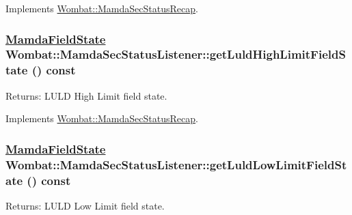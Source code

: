 Implements \hyperlink{classWombat_1_1MamdaSecStatusRecap_db80d6bb0167935b3b622d6dde3a42bd}{Wombat::Mamda\-Sec\-Status\-Recap}.\hypertarget{classWombat_1_1MamdaSecStatusListener_d56a6b2b5df893dd0ffc515ade629a43}{
\subsubsection[getLuldHighLimitFieldState]{\setlength{\rightskip}{0pt plus 5cm}\hyperlink{namespaceWombat_93aac974f2ab713554fd12a1fa3b7d2a}{Mamda\-Field\-State} Wombat::Mamda\-Sec\-Status\-Listener::get\-Luld\-High\-Limit\-Field\-State () const}}
\label{classWombat_1_1MamdaSecStatusListener_d56a6b2b5df893dd0ffc515ade629a43}


\begin{Desc}
\item[Returns:]LULD High Limit field state. \end{Desc}


Implements \hyperlink{classWombat_1_1MamdaSecStatusRecap_1c7c1b9dd0362117ad1e877fa24a3227}{Wombat::Mamda\-Sec\-Status\-Recap}.\hypertarget{classWombat_1_1MamdaSecStatusListener_ec9193e6cfd9d44150815af67ea2fbac}{
\subsubsection[getLuldLowLimitFieldState]{\setlength{\rightskip}{0pt plus 5cm}\hyperlink{namespaceWombat_93aac974f2ab713554fd12a1fa3b7d2a}{Mamda\-Field\-State} Wombat::Mamda\-Sec\-Status\-Listener::get\-Luld\-Low\-Limit\-Field\-State () const}}
\label{classWombat_1_1MamdaSecStatusListener_ec9193e6cfd9d44150815af67ea2fbac}


\begin{Desc}
\item[Returns:]LULD Low Limit field state. \end{Desc}


